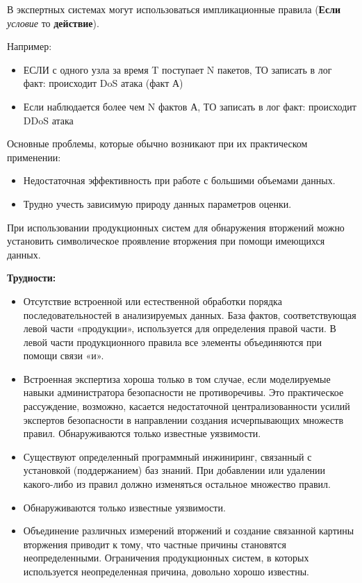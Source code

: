 В экспертных системах могут использоваться импликационные правила (\textbf{Если} \textit{условие} то 
\textbf{действие}).

Например:
\begin{itemize}
	\item ЕСЛИ с одного узла за время T поступает N пакетов, ТО записать в лог факт: 
	происходит DoS атака (факт А)
	
	\item Если наблюдается более чем N фактов А, ТО записать в лог факт: происходит DDoS атака
\end{itemize}

Основные проблемы, которые обычно возникают при их практическом применении:
\begin{itemize}
    \item Недостаточная эффективность при работе с большими объемами данных.
    \item Трудно учесть зависимую природу данных параметров оценки.
\end{itemize}

При использовании продукционных систем для обнаружения вторжений можно установить символическое 
проявление вторжения при помощи имеющихся данных.

\textbf{Трудности:}
\begin{itemize}
    \item Отсутствие встроенной или естественной обработки порядка последовательностей в анализируемых 
    данных. База фактов, соответствующая левой части «продукции», используется для определения правой 
    части. В левой части продукционного правила все элементы объединяются при помощи связи «и».
    \item Встроенная экспертиза хороша только в том случае, если моделируемые навыки администратора 
    безопасности не противоречивы. Это практическое рассуждение, возможно, касается 
    недостаточной централизованности усилий экспертов безопасности в направлении создания 
    исчерпывающих множеств правил. Обнаруживаются только известные уязвимости.
    \item Существуют определенный программный инжиниринг, связанный с установкой (поддержанием) баз знаний. 
    При добавлении или удалении какого-либо из правил должно изменяться остальное множество правил.
    \item Обнаруживаются только известные уязвимости.
    \item Объединение различных измерений вторжений и создание связанной картины вторжения приводит к 
    тому, что частные причины становятся неопределенными. Ограничения продукционных систем, в 
    которых используется неопределенная причина, довольно хорошо известны.
\end{itemize}



